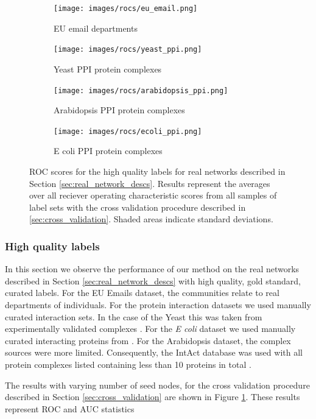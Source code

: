 \documentclass[sigconf]{acmart}
\begin{document}
\begin{figure}
     \centering
    \begin{subfigure}[b]{0.48\textwidth}
        \centering
        \texttt{[image: images/rocs/eu\_email.png]}
        \caption{EU email departments}
    \end{subfigure}
    \begin{subfigure}[b]{0.48\textwidth}
        \centering
        \texttt{[image: images/rocs/yeast\_ppi.png]}
        \caption{Yeast PPI protein complexes}
    \end{subfigure}
    
    \begin{subfigure}[b]{0.48\textwidth}
        \centering
        \texttt{[image: images/rocs/arabidopsis\_ppi.png]}
        \caption{Arabidopsis PPI protein complexes}
    \end{subfigure}
    \begin{subfigure}[b]{0.48\textwidth}
        \centering
        \texttt{[image: images/rocs/ecoli\_ppi.png]}
        \caption{E coli PPI protein complexes}
    \end{subfigure}
    \caption{ROC scores for the high quality labels for real networks described in Section \ref{sec:real_network_descs}. 
    Results represent the averages over all reciever operating characteristic scores from all samples of label sets with the cross validation procedure described in \ref{sec:cross_validation}.
    Shaded areas indicate standard deviations.}
    \label{fig:quality_label_rocs}
\end{figure}
% 
% 
\subsubsection{High quality labels}
In this section we observe the performance of our method on the real networks described in Section \ref{sec:real_network_descs} with high quality, gold standard, curated labels.
For the EU Emails dataset, the communities relate to real departments of individuals.
For the protein interaction datasets we used manually curated interaction sets.
In the case of the Yeast this was taken from experimentally validated complexes  \cite{pu2008up}.
For the \textit{E coli} dataset we used manually curated interacting proteins from \cite{}.
For the Arabidopsis dataset, the complex sources were more limited.
Consequently, the IntAct database was used with all protein complexes listed containing less than 10 proteins in total \cite{}.

The results with varying number of seed nodes, for the cross validation procedure described in Section \ref{sec:cross_validation} are shown in Figure \ref{fig:quality_label_rocs}.
These results represent ROC and AUC statistics 
\end{document}
